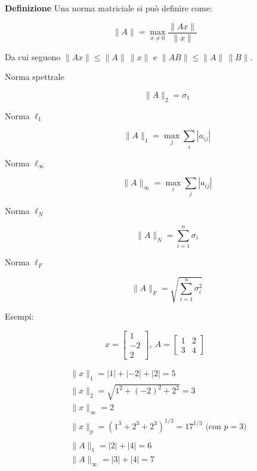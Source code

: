 \documentclass{article}
\newcommand{\df}{\noindent\textbf{Definizione} }
\begin{document}
\df Una norma matriciale si può definire come:

\[
\|A\|
=
\max_{x\neq0}
\frac{\|Ax\|}{\|x\|}
\]

\vspace{5pt}

Da cui seguono $\|Ax\|
\le
\|A\|\,\|x\|$ e $
\|AB\|
\le
\|A\|\,\|B\|.
$

\newpage

\begin{description}
    \item[Norma spettrale\footnotemark] 

    \[
    \|A\|_2=\sigma_1
    \]
    
    \item[Norma \texorpdfstring{\(\ell_1\)}{l1}] 

    \[
    \|A\|_1
    =
    \max_j
    \sum_i |a_{ij}|
    \]
    
    \item[Norma \texorpdfstring{\(\ell_\infty\)}{linf}] 

    \[
    \|A\|_\infty
    =
    \max_i
    \sum_j |a_{ij}|
    \]

    \item[Norma \texorpdfstring{\(\ell_N\)\footnotemark[2]}{ln}] 

    \[
    \|A\|_N
    =
    \sum_{i=1}^{n}\sigma_i
    \]

    \item[Norma \texorpdfstring{\(\ell_F\)\footnotemark[2]}{lf}] 

    \[
    \|A\|_F
    =
    \sqrt{\sum_{i=1}^{n}\sigma_i^2}
    \]\newline
    
\end{description}

Esempi:

\[
x=
\begin{bmatrix}
1\\
-2\\
2
\end{bmatrix},\
A=
\begin{bmatrix}
1&2\\
3&4
\end{bmatrix}
\]

\begin{align*}
&\|x\|_1
=
|1|+|-2|+|2|
=
5
\\
&\|x\|_2
=
\sqrt{1^2+(-2)^2+2^2}
=
3
\\
&\|x\|_\infty
=
2
\\
&\|x\|_p
=
(1^3+2^3+2^3)^{1/3}
=
17^{1/3}
\text{ (con }p=3)
\\
\\
&\|A\|_1
=
|2|+|4|=6
\\
&\|A\|_\infty
=
|3|+|4|=7
\end{align*}
\end{document}
